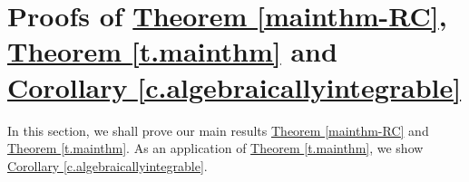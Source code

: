 \section{Proofs of \texorpdfstring{{\hyperref[mainthm-RC]{Theorem \ref*{mainthm-RC}}}}{text},  \texorpdfstring{{\hyperref[t.mainthm]{Theorem \ref*{t.mainthm}}}}{text} and \texorpdfstring{{\hyperref[c.algebraicallyintegrable]{Corollary \ref*{c.algebraicallyintegrable}}}}{text}}

In this section, we shall prove our main results {\hyperref[mainthm-RC]{Theorem \ref*{mainthm-RC}}} and {\hyperref[t.mainthm]{Theorem \ref*{t.mainthm}}}. 
As an application of {\hyperref[t.mainthm]{Theorem \ref*{t.mainthm}}}, we show {\hyperref[c.algebraicallyintegrable]{Corollary \ref*{c.algebraicallyintegrable}}}. 



